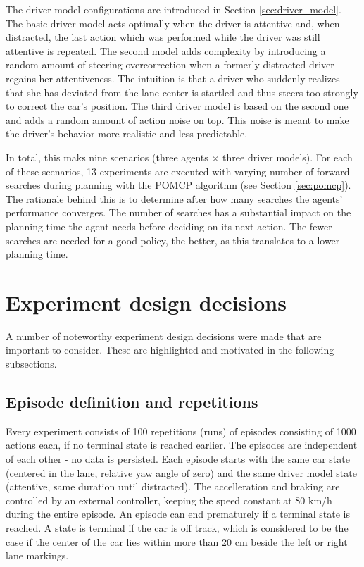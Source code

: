 The driver model configurations are introduced in Section \ref{sec:driver_model}. The basic driver model acts optimally when the driver is attentive and, when distracted, the last action which was performed while the driver was still attentive is repeated. The second model adds complexity by introducing a random amount of steering overcorrection when a formerly distracted driver regains her attentiveness. The intuition is that  a driver who suddenly realizes that she has deviated from the lane center is startled and thus steers too strongly to correct the car's position. The third driver model is based on the second one and adds a random amount of action noise on top. This noise is meant to make the driver's behavior more realistic and less predictable.

In total, this maks nine scenarios (three agents $\times$ three driver models). For each of these scenarios, 13 experiments are executed with varying number of forward searches during planning with the POMCP algorithm (see Section \ref{sec:pomcp}). The rationale behind this is to determine after how many searches the agents' performance converges. The number of searches has a substantial impact on the planning time the agent needs before deciding on its next action. The fewer searches are needed for a good policy, the better, as this translates to a lower planning time.

\section{Experiment design decisions}
A number of noteworthy experiment design decisions were made that are important to consider. These are highlighted and motivated in the following subsections.

\subsection{Episode definition and repetitions}

Every experiment consists of 100 repetitions (runs) of episodes consisting of 1000 actions each, if no terminal state is reached earlier. The episodes are independent of each other - no data is persisted. Each episode starts with the same car state (centered in the lane, relative yaw angle of zero) and the same driver model state (attentive, same duration until distracted). The accelleration and braking are controlled by an external controller, keeping the speed constant at 80 km/h during the entire episode. An episode can end prematurely if a terminal state is reached. A state is terminal if the car is off track, which is considered to be the case if the center of the car lies within more than 20 cm beside the left or right lane markings.

